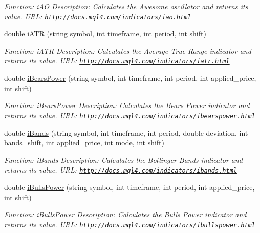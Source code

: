 \begin{DoxyCompactItemize}
\begin{DoxyCompactList}\small\item\em Function\+: i\+AO Description\+: Calculates the Awesome oscillator and returns its value. U\+RL\+: \href{http://docs.mql4.com/indicators/iao.html}{\tt http\+://docs.\+mql4.\+com/indicators/iao.\+html} \end{DoxyCompactList}\item 
double \hyperlink{class_m_q_l4_c_sharp_1_1_base_1_1_m_q_l_base_ae0420a2bded13a1adf764d3f07110cce}{i\+A\+TR} (string symbol, int timeframe, int period, int shift)
\begin{DoxyCompactList}\small\item\em Function\+: i\+A\+TR Description\+: Calculates the Average True Range indicator and returns its value. U\+RL\+: \href{http://docs.mql4.com/indicators/iatr.html}{\tt http\+://docs.\+mql4.\+com/indicators/iatr.\+html} \end{DoxyCompactList}\item 
double \hyperlink{class_m_q_l4_c_sharp_1_1_base_1_1_m_q_l_base_a7763c330c07d24d5b35bff8ea9284413}{i\+Bears\+Power} (string symbol, int timeframe, int period, int applied\+\_\+price, int shift)
\begin{DoxyCompactList}\small\item\em Function\+: i\+Bears\+Power Description\+: Calculates the Bears Power indicator and returns its value. U\+RL\+: \href{http://docs.mql4.com/indicators/ibearspower.html}{\tt http\+://docs.\+mql4.\+com/indicators/ibearspower.\+html} \end{DoxyCompactList}\item 
double \hyperlink{class_m_q_l4_c_sharp_1_1_base_1_1_m_q_l_base_ab9b6a45b346e8060914ec1c45fb1de3d}{i\+Bands} (string symbol, int timeframe, int period, double deviation, int bands\+\_\+shift, int applied\+\_\+price, int mode, int shift)
\begin{DoxyCompactList}\small\item\em Function\+: i\+Bands Description\+: Calculates the Bollinger Bands indicator and returns its value. U\+RL\+: \href{http://docs.mql4.com/indicators/ibands.html}{\tt http\+://docs.\+mql4.\+com/indicators/ibands.\+html} \end{DoxyCompactList}\item 
double \hyperlink{class_m_q_l4_c_sharp_1_1_base_1_1_m_q_l_base_a2464689cf445235469b937bb3b7c6b09}{i\+Bulls\+Power} (string symbol, int timeframe, int period, int applied\+\_\+price, int shift)
\begin{DoxyCompactList}\small\item\em Function\+: i\+Bulls\+Power Description\+: Calculates the Bulls Power indicator and returns its value. U\+RL\+: \href{http://docs.mql4.com/indicators/ibullspower.html}{\tt http\+://docs.\+mql4.\+com/indicators/ibullspower.\+html} \end{DoxyCompactList}\item 

\end{DoxyCompactItemize}
